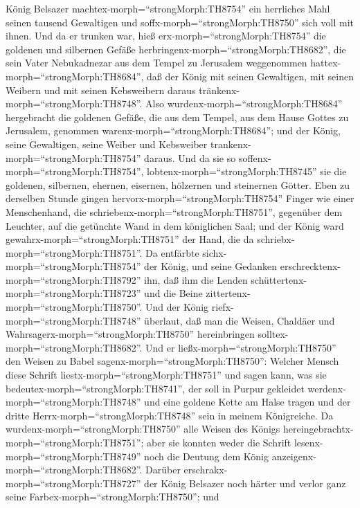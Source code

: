  König Belsazer machtex-morph=``strongMorph:TH8754'' ein
herrliches Mahl seinen tausend Gewaltigen und
soffx-morph=``strongMorph:TH8750'' sich voll mit ihnen.  Und
da er trunken war, hieß erx-morph=``strongMorph:TH8754'' die goldenen
und silbernen Gefäße herbringenx-morph=``strongMorph:TH8682'', die sein
Vater Nebukadnezar aus dem Tempel zu Jerusalem weggenommen
hattex-morph=``strongMorph:TH8684'', daß der König mit seinen
Gewaltigen, mit seinen Weibern und mit seinen Kebsweibern daraus
tränkenx-morph=``strongMorph:TH8748''.  Also
wurdenx-morph=``strongMorph:TH8684'' hergebracht die goldenen Gefäße,
die aus dem Tempel, aus dem Hause Gottes zu Jerusalem, genommen
warenx-morph=``strongMorph:TH8684''; und der König, seine Gewaltigen,
seine Weiber und Kebsweiber trankenx-morph=``strongMorph:TH8754''
daraus.  Und da sie so soffenx-morph=``strongMorph:TH8754'',
lobtenx-morph=``strongMorph:TH8745'' sie die goldenen, silbernen,
ehernen, eisernen, hölzernen und steinernen Götter.  Eben zu
derselben Stunde gingen hervorx-morph=``strongMorph:TH8754'' Finger wie
einer Menschenhand, die schriebenx-morph=``strongMorph:TH8751'',
gegenüber dem Leuchter, auf die getünchte Wand in dem königlichen Saal;
und der König ward gewahrx-morph=``strongMorph:TH8751'' der Hand, die da
schriebx-morph=``strongMorph:TH8751''.  Da entfärbte
sichx-morph=``strongMorph:TH8754'' der König, und seine Gedanken
erschrecktenx-morph=``strongMorph:TH8792'' ihn, daß ihm die Lenden
schüttertenx-morph=``strongMorph:TH8723'' und die Beine
zittertenx-morph=``strongMorph:TH8750''.  Und der König
riefx-morph=``strongMorph:TH8748'' überlaut, daß man die Weisen,
Chaldäer und Wahrsagerx-morph=``strongMorph:TH8750'' hereinbringen
solltex-morph=``strongMorph:TH8682''. Und er
ließx-morph=``strongMorph:TH8750'' den Weisen zu Babel
sagenx-morph=``strongMorph:TH8750'': Welcher Mensch diese Schrift
liestx-morph=``strongMorph:TH8751'' und sagen kann, was sie
bedeutex-morph=``strongMorph:TH8741'', der soll in Purpur gekleidet
werdenx-morph=``strongMorph:TH8748'' und eine goldene Kette am Halse
tragen und der dritte Herrx-morph=``strongMorph:TH8748'' sein in meinem
Königreiche.  Da wurdenx-morph=``strongMorph:TH8750'' alle
Weisen des Königs hereingebrachtx-morph=``strongMorph:TH8751''; aber sie
konnten weder die Schrift lesenx-morph=``strongMorph:TH8749'' noch die
Deutung dem König anzeigenx-morph=``strongMorph:TH8682''. 
Darüber erschrakx-morph=``strongMorph:TH8727'' der König Belsazer noch
härter und verlor ganz seine Farbex-morph=``strongMorph:TH8750''; und
